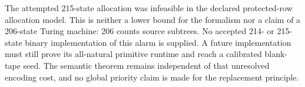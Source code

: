 The attempted 215-state allocation was infeasible in the declared
protected-row allocation model.  This is neither a lower bound for the
formalism nor a claim of a 206-state Turing machine: 206 counts source
subtrees.  No accepted 214- or 215-state binary implementation of this
alarm is supplied.  A future implementation must still prove its
all-natural primitive runtime and reach a calibrated blank-tape seed.
The semantic theorem remains independent of that unresolved encoding
cost, and no global priority claim is made for the replacement principle.
